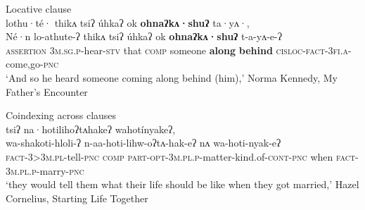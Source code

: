 \documentclass[output=paper]{langscibook}
\begin{document}

   
  
 \ea%
    \label{ex:oneida:29}
    Locative clause\\
  {lothu·té·} {thikʌ} {tsiʔ} {úhkaʔ} {ok} \textbf{{ohnaʔkʌ·shuʔ}} {ta·yʌ·,} \\
 {Né·n} lo-athute-ʔ {thikʌ} {tsiʔ} {úhkaʔ} {ok} \textbf{{ohnaʔkʌ·shuʔ}} t-a-yʌ-e-ʔ\\
 \textsc{assertion} \textsc{3m.sg.p-}hear\textsc{-stv} that  \textsc{comp} someone \textbf{along} \textbf{behind}  \textsc{cisloc-fact-3fi.a-}come,go\textsc{{}-pnc}\\
    \glt ‘And so he heard someone coming along behind (him),’ Norma Kennedy,   {My}   {Father’s} {Encounter}
\z
   
    \label{ex:oneida:30}
   Coindexing across clauses\\
    {tsiʔ} {na·hotilihoʔtʌhakeʔ} {wahotínyakeʔ,} \\
    wa-shakoti-hloli-ʔ { } n-aa-hoti-lihw-oʔtʌ-hak-eʔ {nʌ} wa-hoti-nyak-eʔ\\
\textsc{fact-3>3m.pl-}tell\textsc{-pnc}  \textsc{comp}    \textsc{part-opt-3m.pl.p-}matter-kind.of\textsc{{}-cont-pnc} when \textsc{fact-3m.pl.p-}marry\textsc{{}-pnc}\\
\glt  ‘they would tell them what their life should be like when they got married,’ Hazel   Cornelius, {Starting} {Life} {Together}
   \z  
\end{document}
